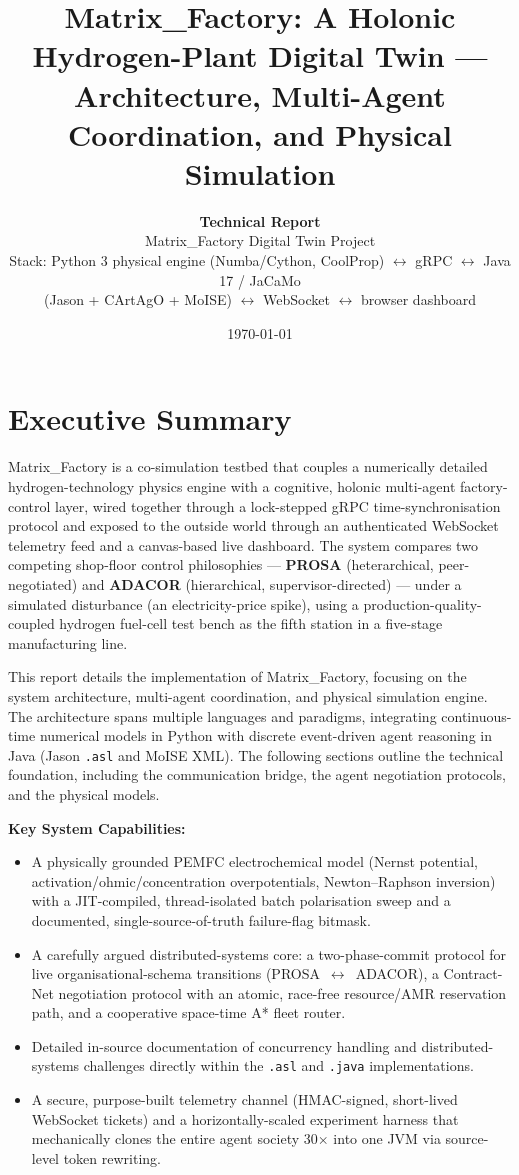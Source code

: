 \documentclass[twocolumn,10pt,a4paper]{article}
\title{\vspace{-10mm}\textbf{\Large Matrix\_Factory: A Holonic Hydrogen-Plant Digital Twin --- Architecture, Multi-Agent Coordination, and Physical Simulation}}
\author{
  \textbf{Technical Report} \\
  \small Matrix\_Factory Digital Twin Project \\ \vspace{1mm}
  \small Stack: Python 3 physical engine (Numba/Cython, CoolProp) $\leftrightarrow$ gRPC $\leftrightarrow$ Java 17 / JaCaMo \\
  \small (Jason + CArtAgO + MoISE) $\leftrightarrow$ WebSocket $\leftrightarrow$ browser dashboard
}
\date{\small \today}
\newcommand{\code}[1]{\texttt{\small #1}}
\begin{document}
\maketitle


\vspace{2mm}
\tableofcontents
\vspace{2mm}

\section*{Executive Summary}

Matrix\_Factory is a co-simulation testbed that couples a numerically detailed hydrogen-technology physics engine with a cognitive, holonic multi-agent factory-control layer, wired together through a lock-stepped gRPC time-synchronisation protocol and exposed to the outside world through an authenticated WebSocket telemetry feed and a canvas-based live dashboard. The system compares two competing shop-floor control philosophies --- \textbf{PROSA} (heterarchical, peer-negotiated) and \textbf{ADACOR} (hierarchical, supervisor-directed) --- under a simulated disturbance (an electricity-price spike), using a production-quality-coupled hydrogen fuel-cell test bench as the fifth station in a five-stage manufacturing line.

This report details the implementation of Matrix\_Factory, focusing on the system architecture, multi-agent coordination, and physical simulation engine. The architecture spans multiple languages and paradigms, integrating continuous-time numerical models in Python with discrete event-driven agent reasoning in Java (Jason \code{.asl} and MoISE XML). The following sections outline the technical foundation, including the communication bridge, the agent negotiation protocols, and the physical models.

\textbf{Key System Capabilities:}
\begin{itemize}
\item A physically grounded PEMFC electrochemical model (Nernst potential, activation/ohmic/concentration overpotentials, Newton--Raphson inversion) with a JIT-compiled, thread-isolated batch polarisation sweep and a documented, single-source-of-truth failure-flag bitmask.
\item A carefully argued distributed-systems core: a two-phase-commit protocol for live organisational-schema transitions (PROSA~$\leftrightarrow$~ADACOR), a Contract-Net negotiation protocol with an atomic, race-free resource/AMR reservation path, and a cooperative space-time A* fleet router.
\item Detailed in-source documentation of concurrency handling and distributed-systems challenges directly within the \code{.asl} and \code{.java} implementations.
\item A secure, purpose-built telemetry channel (HMAC-signed, short-lived WebSocket tickets) and a horizontally-scaled experiment harness that mechanically clones the entire agent society 30$\times$ into one JVM via source-level token rewriting.
\end{itemize}
\end{document}
